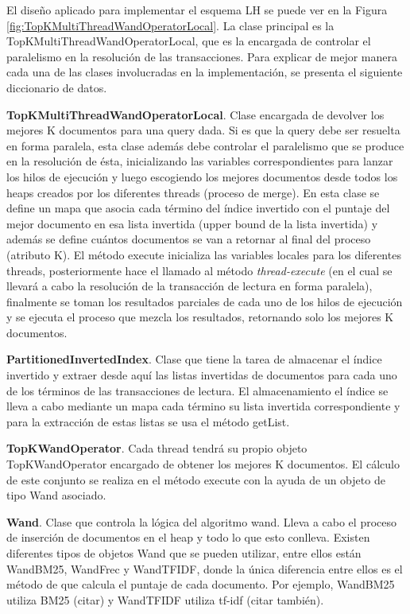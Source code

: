 El diseño aplicado para implementar el esquema LH se puede ver en la Figura \ref{fig:TopKMultiThreadWandOperatorLocal}. La clase principal es la TopKMultiThreadWandOperatorLocal, que es la encargada de controlar el paralelismo en la resolución de las transacciones. Para explicar de mejor manera cada una de las clases involucradas en la implementación, se presenta el siguiente diccionario de datos.

\begin{list}{}{}
	\item \textbf{TopKMultiThreadWandOperatorLocal}. Clase encargada de devolver los mejores K documentos para una query dada. Si es que la query debe ser resuelta en forma paralela, esta clase además debe controlar el paralelismo que se produce en la resolución de ésta, inicializando las variables correspondientes para lanzar los hilos de ejecución y luego escogiendo los mejores documentos desde todos los heaps creados por los diferentes threads (proceso de merge). En esta clase se define un mapa que asocia cada término del índice invertido con el puntaje del mejor documento en esa lista invertida (upper bound de la lista invertida) y además se define cuántos documentos se van a retornar al final del proceso (atributo K). El método execute inicializa las variables locales para los diferentes threads, posteriormente hace el llamado al método \emph{thread-execute} (en el cual se llevará a cabo la resolución de la transacción de lectura en forma paralela), finalmente se toman los resultados parciales de cada uno de los hilos de ejecución y se ejecuta el proceso que mezcla los resultados, retornando solo los mejores K documentos. 
	
	\item \textbf{PartitionedInvertedIndex}. Clase que tiene la tarea de almacenar el índice invertido y extraer desde aquí las listas invertidas de documentos para cada uno de los términos de las transacciones de lectura. El almacenamiento el índice se lleva a cabo mediante un mapa cada término su lista invertida correspondiente y para la extracción de estas listas se usa el método getList.
	
	\item \textbf{TopKWandOperator}.  Cada thread tendrá su propio objeto TopKWandOperator encargado de obtener los mejores K documentos. El cálculo de este conjunto se realiza en el método execute con la ayuda de un objeto de tipo Wand asociado.
	
	\item \textbf{Wand}. Clase que controla la lógica del algoritmo wand. Lleva a cabo el proceso de inserción de documentos en el heap y todo lo que esto conlleva. Existen diferentes tipos de objetos Wand que se pueden utilizar, entre ellos están WandBM25, WandFrec y WandTFIDF, donde la única diferencia entre ellos es el método de que calcula el puntaje de cada documento. Por ejemplo, WandBM25 utiliza BM25 (citar) y WandTFIDF utiliza tf-idf (citar también). 
	

\end{list}
